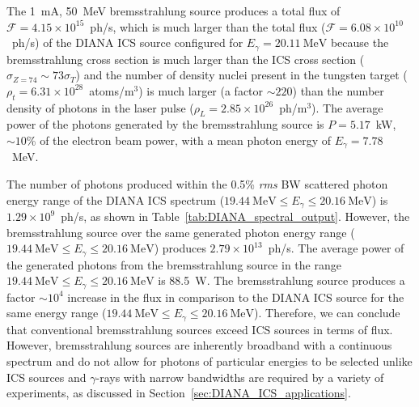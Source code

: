 \documentclass[../main.tex]{subfiles}
\begin{document}
The 1~\si{\milli\ampere}, 50~\si{\mega\electronvolt} bremsstrahlung source produces a total flux of $\mathcal{F} = 4.15\times 10^{15}$~ph/\si{\second}, which is much larger than the total flux ($\mathcal{F} = 6.08\times 10^{10}$~ph/\si{\second}) of the DIANA ICS source configured for $E_{\gamma} = 20.11~\si{\mega\electronvolt}$ because the bremsstrahlung cross section is much larger than the ICS cross section ($\sigma_{Z = 74} \sim 73\sigma_{T}$) and the number of density nuclei present in the tungsten target ($\rho_{t} = 6.31\times 10^{28}$~atoms/\si{\meter}$^{3}$) is much larger (a factor $\sim 220$) than the number density of photons in the laser pulse ($\rho_{L} = 2.85\times 10^{26}$~ph/\si{\meter}$^{3}$). The average power of the photons generated by the bremsstrahlung source is $P = 5.17$~\si{\kilo\watt}, $\sim 10$\% of the electron beam power, with a mean photon energy of $E_{\gamma} = 7.78$~\si{\mega\electronvolt}.

The number of photons produced within the 0.5\% \textit{rms} BW scattered photon energy range of the DIANA ICS spectrum ($19.44~\mathrm{\si{\mega\electronvolt}} \leq E_{\gamma} \leq 20.16~\mathrm{\si{\mega\electronvolt}}$) is $1.29\times 10^{9}$~ph/\si{\second}, as shown in Table~\ref{tab:DIANA_spectral_output}. However, the bremsstrahlung source over the same generated photon energy range ($19.44~\mathrm{\si{\mega\electronvolt}} \leq E_{\gamma} \leq 20.16~\mathrm{\si{\mega\electronvolt}}$) produces $2.79\times 10^{13}$~ph/\si{\second}. The average power of the generated photons from the bremsstrahlung source in the range $19.44~\mathrm{\si{\mega\electronvolt}} \leq E_{\gamma} \leq 20.16~\mathrm{\si{\mega\electronvolt}}$ is 88.5~\si{\watt}. The bremsstrahlung source produces a factor $\sim10^{4}$ increase in the flux in comparison to the DIANA ICS source for the same energy range ($19.44~\mathrm{\si{\mega\electronvolt}} \leq E_{\gamma} \leq 20.16~\mathrm{\si{\mega\electronvolt}}$). Therefore, we can conclude that conventional bremsstrahlung sources exceed ICS sources in terms of flux. However, bremsstrahlung sources are inherently broadband with a continuous spectrum and do not allow for photons of particular energies to be selected unlike ICS sources and $\gamma$-rays with narrow bandwidths are required by a variety of experiments, as discussed in Section~\ref{sec:DIANA_ICS_applications}. 
\end{document}

